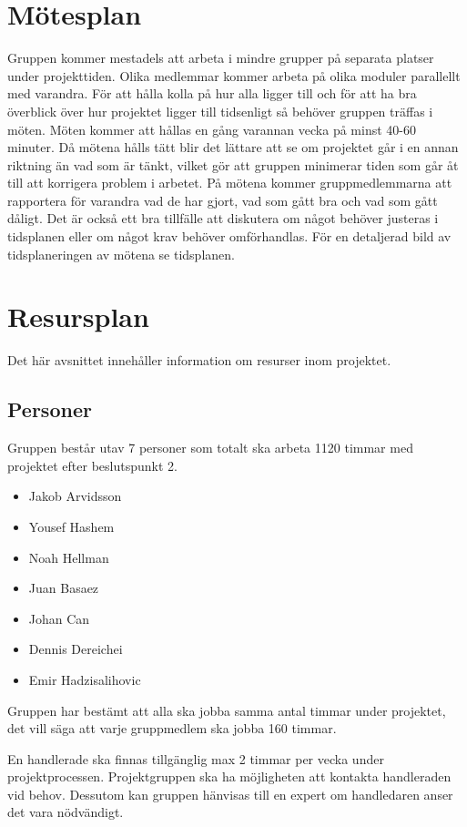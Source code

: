 \documentclass[projektplan/plan.tex]{subfiles}
\begin{document}
\section{Mötesplan}
Gruppen kommer mestadels att arbeta i mindre grupper på separata platser under
projekttiden. Olika medlemmar kommer arbeta på olika moduler parallellt med
varandra. För att hålla kolla på hur alla ligger till och för att ha bra
överblick över hur projektet ligger till tidsenligt så behöver gruppen träffas
i möten. Möten kommer att hållas en gång varannan vecka på minst 40-60 minuter.
Då mötena hålls tätt blir det lättare att se om projektet går i en annan
riktning än vad som är tänkt, vilket gör att gruppen minimerar tiden som går åt
till att korrigera problem i arbetet. På mötena kommer gruppmedlemmarna att rapportera
för varandra vad de har gjort, vad som gått bra och vad som gått dåligt. Det är
också ett bra tillfälle att diskutera om något behöver justeras i tidsplanen
eller om något krav behöver omförhandlas. För en detaljerad bild av
tidsplaneringen av mötena se tidsplanen.

\section{Resursplan}
Det här avsnittet innehåller information om resurser inom projektet.

\subsection{Personer}
Gruppen består utav 7 personer som totalt ska arbeta 1120 timmar med projektet
efter beslutspunkt 2.

\begin{itemize}
    \item Jakob Arvidsson
    \item Yousef Hashem
    \item Noah Hellman
    \item Juan Basaez
    \item Johan Can
    \item Dennis Dereichei
    \item Emir Hadzisalihovic
\end{itemize}
Gruppen har bestämt att alla ska jobba samma antal timmar under projektet, det
vill säga att varje gruppmedlem ska jobba 160 timmar.

En handlerade ska finnas tillgänglig max 2 timmar per vecka under projektprocessen.
Projektgruppen ska ha möjligheten att kontakta handleraden vid behov.
Dessutom kan gruppen hänvisas till en expert om handledaren anser det vara
nödvändigt.
\end{document}
